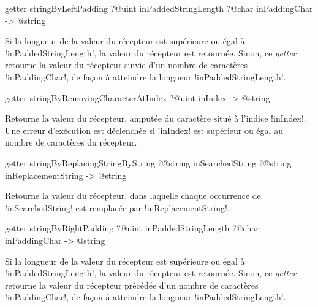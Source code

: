 
\begin{galgasbox}
getter stringByLeftPadding
   ?@uint inPaddedStringLength
   ?@char inPaddingChar -> @string
\end{galgasbox}

Si la longueur de la valeur du récepteur est supérieure ou égal à \ggs!inPaddedStringLength!, la valeur du récepteur est retournée. Sinon, ce \emph{getter} retourne la valeur du récepteur suivie d'un nombre de caractères \ggs!inPaddingChar!, de façon à atteindre la longueur \ggs!inPaddedStringLength!.








\begin{galgasbox}
getter stringByRemovingCharacterAtIndex ?@uint inIndex -> @string
\end{galgasbox}

Retourne la valeur du récepteur, amputée du caractère situé à l'indice \ggs!inIndex!. Une erreur d'exécution est déclenchée si \ggs!inIndex! est supérieur ou égal au nombre de caractères du récepteur.








\begin{galgasbox}
getter stringByReplacingStringByString
     ?@string inSearchedString
     ?@string inReplacementString  -> @string
\end{galgasbox}

Retourne la valeur du récepteur, dans laquelle chaque occurrence de \ggs!inSearchedString! est remplacée par \ggs!inReplacementString!.








\begin{galgasbox}
getter stringByRightPadding
   ?@uint inPaddedStringLength
   ?@char inPaddingChar -> @string
\end{galgasbox}

Si la longueur de la valeur du récepteur est supérieure ou égal à \ggs!inPaddedStringLength!, la valeur du récepteur est retournée. Sinon, ce \emph{getter} retourne la valeur du récepteur précédée d'un nombre de caractères \ggs!inPaddingChar!, de façon à atteindre la longueur \ggs!inPaddedStringLength!.




